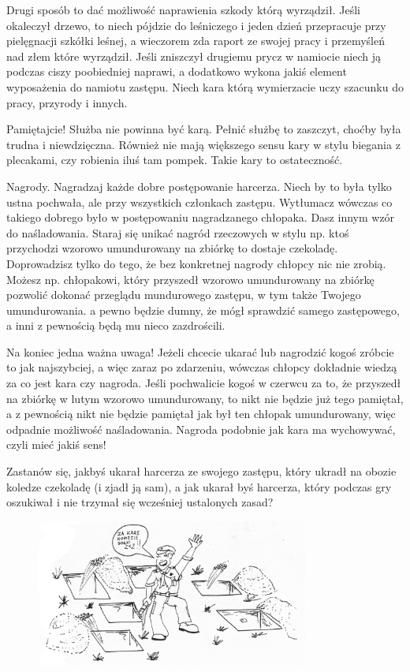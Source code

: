 Drugi sposób to dać możliwość naprawienia szkody którą wyrządził. Jeśli okaleczył drzewo, to niech pójdzie do leśniczego i jeden dzień przepracuje przy pielęgnacji szkółki leśnej, a wieczorem zda raport ze swojej pracy i przemyśleń nad złem które wyrządził. Jeśli zniszczył drugiemu prycz w namiocie niech ją podczas ciszy poobiedniej naprawi, a dodatkowo wykona jakiś element wyposażenia do namiotu zastępu. Niech kara którą wymierzacie uczy szacunku do pracy, przyrody i innych.

Pamiętajcie! Służba nie powinna być karą. Pełnić służbę to zaszczyt, choćby była trudna i niewdzięczna. Również nie mają większego sensu kary  w stylu biegania z plecakami, czy  robienia iluś tam pompek. Takie kary to ostateczność.

Nagrody. Nagradzaj każde dobre postępowanie harcerza. Niech by to była tylko ustna pochwała, ale przy  wszystkich członkach zastępu. Wytłumacz wówczas co takiego dobrego było w postępowaniu nagradzanego chłopaka. Dasz  innym wzór do naśladowania. Staraj się unikać nagród rzeczowych  w  stylu  np. ktoś przychodzi wzorowo umundurowany na zbiórkę to dostaje czekoladę. Doprowadzisz tylko do tego, że bez konkretnej nagrody chłopcy nic nie zrobią. Możesz np. chłopakowi, który przyszedł wzorowo umundurowany na zbiórkę pozwolić dokonać przeglądu mundurowego zastępu, w tym także Twojego  umundurowania.  a  pewno będzie  dumny, że mógł  sprawdzić   samego  zastępowego, a inni z pewnością będą mu nieco  zazdrościli.

Na koniec jedna ważna uwaga! Jeżeli chcecie ukarać lub nagrodzić kogoś zróbcie to jak najszybciej, a więc zaraz po zdarzeniu, wówczas chłopcy dokładnie wiedzą za co jest kara czy nagroda. Jeśli pochwalicie kogoś w czerwcu za to, że przyszedł na zbiórkę w lutym wzorowo umundurowany, to nikt nie będzie już  tego pamiętał, a z pewnością nikt nie będzie pamiętał jak był ten chłopak umundurowany, więc odpadnie możliwość naśladowania. Nagroda podobnie jak kara ma wychowywać, czyli mieć jakiś sens!

Zastanów się, jakbyś ukarał harcerza ze swojego zastępu, który ukradł na obozie  koledze czekoladę (i zjadł  ją sam), a jak ukarał byś harcerza, który podczas gry  oszukiwał i nie trzymał się wcześniej ustalonych zasad?

\begin{figure}[h]
\begin{center}
\includegraphics[width=0.8\textwidth]{grafiki/kara.png}
\end{center}
\end{figure}
	


